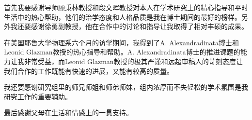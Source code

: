 \begin{acknowledgement}
  首先我要感谢导师顾秉林教授和段文晖教授对本人在学术研究上的精心指导和平时生活中的热心帮助，他们的治学态度和人格品质是我在博士期间的最好的榜样。另外我还要感谢徐勇副教授，他在合作中的讨论和指导让我取得了相对丰硕的成果。

  在美国耶鲁大学物理系六个月的访学期间，我得到了A. Alexandradinata博士和Leonid Glazman教授的热心指导和帮助。A. Alexandradinata博士的推进课题的能力让我非常受益，而Leonid Glazman教授的极其严谨和远超审稿人的苛刻态度让我们合作的工作既能有快速的进展，又能有较高的质量。

  我还要感谢研究组里的师兄师姐和师弟师妹，组内浓厚而不失轻松的学术氛围是我研究工作的重要辅助。

  最后感谢父母在生活和情感上的一贯支持。
\end{acknowledgement}
